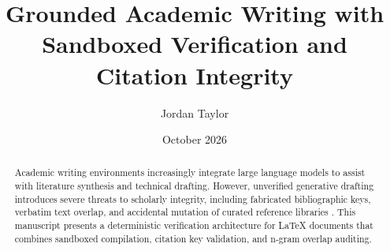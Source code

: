 \documentclass[11pt,a4paper]{academic-manuscript}
\title{Grounded Academic Writing with Sandboxed Verification and Citation Integrity}
\author{Jordan Taylor}
\date{October 2026}
\begin{document}
\makemanuscripttitle

\begin{abstract}
Academic writing environments increasingly integrate large language models to assist with literature synthesis and technical drafting. However, unverified generative drafting introduces severe threats to scholarly integrity, including fabricated bibliographic keys, verbatim text overlap, and accidental mutation of curated reference libraries \cite{vaswani2017attention,lewis2020retrieval}. This manuscript presents a deterministic verification architecture for LaTeX documents that combines sandboxed compilation, citation key validation, and n-gram overlap auditing.
\end{abstract}

\tableofcontents






\end{document}
